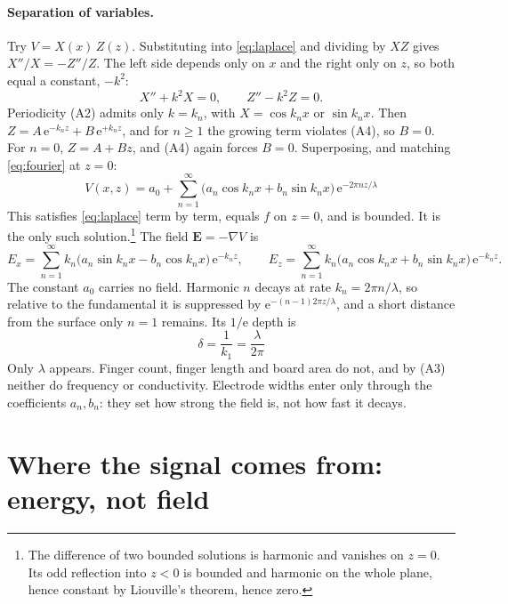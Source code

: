 \documentclass[11pt,letterpaper]{article}
\newcommand{\e}{\mathrm{e}}
\begin{document}
\paragraph{Separation of variables.} Try $V = X(x)\,Z(z)$. Substituting into \eqref{eq:laplace} and
dividing by $XZ$ gives $X''/X = -Z''/Z$. The left side depends only on $x$ and the right only on $z$, so
both equal a constant, $-k^2$:
\begin{equation}
  X'' + k^2 X = 0, \qquad Z'' - k^2 Z = 0.
  \label{eq:separated}
\end{equation}
Periodicity (A2) admits only $k = k_n$, with $X = \cos k_n x$ or $\sin k_n x$. Then
$Z = A\,\e^{-k_n z} + B\,\e^{+k_n z}$, and for $n \ge 1$ the growing term violates (A4), so $B = 0$. For
$n = 0$, $Z = A + Bz$, and (A4) again forces $B = 0$. Superposing, and matching \eqref{eq:fourier} at
$z = 0$:
\begin{equation}
  \boxed{\;V(x,z) = a_0 + \sum_{n=1}^{\infty} \bigl( a_n \cos k_n x + b_n \sin k_n x \bigr)\,\e^{-2\pi n z/\lambda}\;}
  \label{eq:solution}
\end{equation}
This satisfies \eqref{eq:laplace} term by term, equals $f$ on $z = 0$, and is bounded. It is the only
such solution.\footnote{The difference of two bounded solutions is harmonic and vanishes on $z = 0$. Its
odd reflection into $z < 0$ is bounded and harmonic on the whole plane, hence constant by Liouville's
theorem, hence zero.} The field $\mathbf{E} = -\nabla V$ is
\begin{equation}
  E_x = \sum_{n=1}^{\infty} k_n \bigl( a_n \sin k_n x - b_n \cos k_n x \bigr)\,\e^{-k_n z}, \qquad
  E_z = \sum_{n=1}^{\infty} k_n \bigl( a_n \cos k_n x + b_n \sin k_n x \bigr)\,\e^{-k_n z}.
  \label{eq:field}
\end{equation}
The constant $a_0$ carries no field. Harmonic $n$ decays at rate $k_n = 2\pi n/\lambda$, so relative to
the fundamental it is suppressed by $\e^{-(n-1)2\pi z/\lambda}$, and a short distance from the surface
only $n = 1$ remains. Its $1/\e$ depth is
\begin{equation}
  \boxed{\;\delta = \frac{1}{k_1} = \frac{\lambda}{2\pi}\;}
  \label{eq:delta}
\end{equation}
Only $\lambda$ appears. Finger count, finger length and board area do not, and by (A3) neither do
frequency or conductivity. Electrode widths enter only through the coefficients $a_n, b_n$: they set how
strong the field is, not how fast it decays.

\section{Where the signal comes from: energy, not field}
\end{document}
